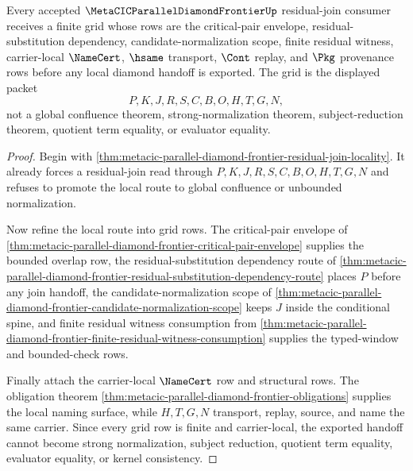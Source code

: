 \begin{theorem}
\label{thm:metacic-parallel-diamond-frontier-residual-grid}
Every accepted $\MetaCICParallelDiamondFrontierUp$ residual-join consumer receives a finite grid whose rows are the critical-pair envelope, residual-substitution dependency, candidate-normalization scope, finite residual witness, carrier-local $\NameCert$, $\hsame$ transport, $\Cont$ replay, and $\Pkg$ provenance rows before any local diamond handoff is exported. The grid is the displayed packet
$$
P,K,J,R,S,C,B,O,H,T,G,N ,
$$
not a global confluence theorem, strong-normalization theorem, subject-reduction theorem, quotient term equality, or evaluator equality.
\end{theorem}
\begin{proof}
Begin with \autoref{thm:metacic-parallel-diamond-frontier-residual-join-locality}. It already forces a residual-join read through $P,K,J,R,S,C,B,O,H,T,G,N$ and refuses to promote the local route to global confluence or unbounded normalization.

Now refine the local route into grid rows. The critical-pair envelope of \autoref{thm:metacic-parallel-diamond-frontier-critical-pair-envelope} supplies the bounded overlap row, the residual-substitution dependency route of \autoref{thm:metacic-parallel-diamond-frontier-residual-substitution-dependency-route} places $P$ before any join handoff, the candidate-normalization scope of \autoref{thm:metacic-parallel-diamond-frontier-candidate-normalization-scope} keeps $J$ inside the conditional spine, and finite residual witness consumption from \autoref{thm:metacic-parallel-diamond-frontier-finite-residual-witness-consumption} supplies the typed-window and bounded-check rows.

Finally attach the carrier-local $\NameCert$ row and structural rows. The obligation theorem \autoref{thm:metacic-parallel-diamond-frontier-obligations} supplies the local naming surface, while $H,T,G,N$ transport, replay, source, and name the same carrier. Since every grid row is finite and carrier-local, the exported handoff cannot become strong normalization, subject reduction, quotient term equality, evaluator equality, or kernel consistency.
\end{proof}

